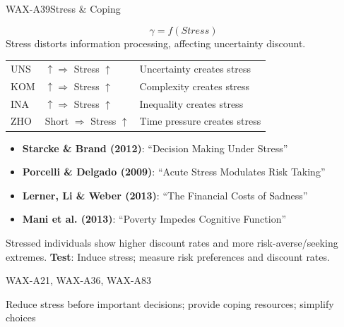 \begin{axiomspec}{WAX-A39}{Stress \& Coping}

\begin{equation}
\gamma = f(Stress)
\end{equation}
Stress distorts information processing, affecting uncertainty discount.

\begin{tabular}{lll}
UNS & $\uparrow \Rightarrow$ Stress $\uparrow$ & Uncertainty creates stress \\
KOM & $\uparrow \Rightarrow$ Stress $\uparrow$ & Complexity creates stress \\
INA & $\uparrow \Rightarrow$ Stress $\uparrow$ & Inequality creates stress \\
ZHO & Short $\Rightarrow$ Stress $\uparrow$ & Time pressure creates stress \\
\end{tabular}

\begin{itemize}
\item \textbf{Starcke \& Brand (2012)}: ``Decision Making Under Stress''
\item \textbf{Porcelli \& Delgado (2009)}: ``Acute Stress Modulates Risk Taking''
\item \textbf{Lerner, Li \& Weber (2013)}: ``The Financial Costs of Sadness''
\item \textbf{Mani et al. (2013)}: ``Poverty Impedes Cognitive Function''
\end{itemize}

Stressed individuals show higher discount rates and more risk-averse/seeking extremes.
\textbf{Test}: Induce stress; measure risk preferences and discount rates.

WAX-A21, WAX-A36, WAX-A83

Reduce stress before important decisions; provide coping resources; simplify choices

\end{axiomspec}


